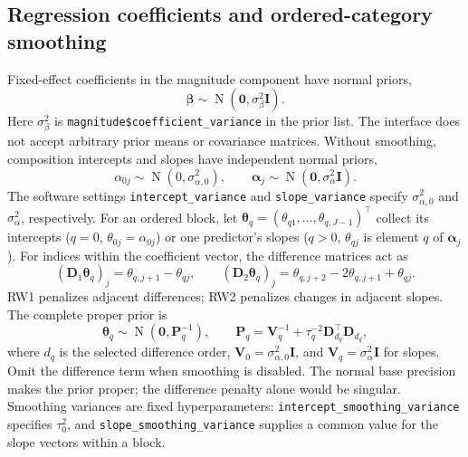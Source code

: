 \documentclass[11pt]{article}
\newcommand{\balpha}{\bm{\alpha}}
\newcommand{\bbeta}{\bm{\beta}}
\newcommand{\btheta}{\bm{\theta}}
\newcommand{\bD}{\bm{D}}
\newcommand{\bI}{\bm{I}}
\newcommand{\bV}{\bm{V}}
\newcommand{\bzero}{\bm{0}}
\newcommand{\bP}{\bm{P}}
\newcommand{\trans}{^\top}
\newcommand{\Normal}{\operatorname{N}}
\begin{document}
\subsection{Regression coefficients and ordered-category smoothing}
\label{sec:smoothing}

Fixed-effect coefficients in the magnitude component have normal priors,
\begin{equation}
  \bbeta \sim \Normal(\bzero,\sigma_\beta^2\bI).
  \label{eq:magnitude-coefficient-prior}
\end{equation}
Here \(\sigma_\beta^2\) is
\texttt{magnitude\$coefficient\_variance} in the prior list.
The interface does not accept arbitrary prior means or covariance matrices.
Without smoothing, composition intercepts and slopes have independent
normal priors,
\begin{equation}
  \alpha_{0j}\sim\Normal(0,\sigma_{\alpha,0}^2),
  \qquad
  \balpha_j\sim\Normal(\bzero,\sigma_\alpha^2\bI).
  \label{eq:composition-coefficient-prior}
\end{equation}
The software settings \texttt{intercept\_variance} and
\texttt{slope\_variance} specify \(\sigma_{\alpha,0}^2\) and
\(\sigma_\alpha^2\), respectively. For an ordered block, let
\(\btheta_q=(\theta_{q1},\ldots,\theta_{q,J-1})\trans\) collect its
intercepts (\(q=0\), \(\theta_{0j}=\alpha_{0j}\)) or one predictor's
slopes (\(q>0\), \(\theta_{qj}\) is element \(q\) of \(\balpha_j\)).
For indices within the coefficient vector, the difference matrices act as
\[
 (\bD_1\btheta_q)_j=\theta_{q,j+1}-\theta_{qj},\qquad
 (\bD_2\btheta_q)_j=\theta_{q,j+2}-2\theta_{q,j+1}+\theta_{qj}.
\]
RW1 penalizes adjacent differences; RW2 penalizes changes in adjacent slopes.
The complete proper prior is
\begin{equation}
 \btheta_q\sim\Normal(\bzero,\bP_q^{-1}),\qquad
 \bP_q=\bV_q^{-1}+\tau_q^{-2}\bD_{d_q}\trans\bD_{d_q},
 \label{eq:proper-smoothing-prior}
\end{equation}
where \(d_q\) is the selected difference order,
\(\bV_0=\sigma_{\alpha,0}^2\bI\), and
\(\bV_q=\sigma_\alpha^2\bI\) for slopes. Omit the difference term when
smoothing is disabled. The normal base precision makes the prior proper;
the difference penalty alone would be singular. Smoothing variances are fixed
hyperparameters: \texttt{intercept\_smoothing\_variance} specifies
\(\tau_0^2\), and \texttt{slope\_smoothing\_variance} supplies a common
value for the slope vectors within a block.
\end{document}
